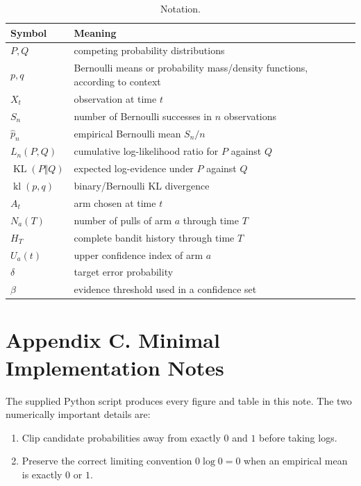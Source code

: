 \documentclass[en,nofont,11pt]{elegantbook}
\newcommand{\KL}{\operatorname{KL}}
\newcommand{\kl}{\operatorname{kl}}
\begin{document}
\begin{table}[H]
\centering
\caption*{Notation.}
\begin{tabular}{p{}p{}}
\toprule
Symbol & Meaning \\
\midrule
$P,Q$ & competing probability distributions \\
$p,q$ & Bernoulli means or probability mass/density functions, according to context \\
$X_t$ & observation at time $t$ \\
$S_n$ & number of Bernoulli successes in $n$ observations \\
$\widehat p_n$ & empirical Bernoulli mean $S_n/n$ \\
$L_n(P,Q)$ & cumulative log-likelihood ratio for $P$ against $Q$ \\
$\KL(P\Vert Q)$ & expected log-evidence under $P$ against $Q$ \\
$\kl(p,q)$ & binary/Bernoulli KL divergence \\
$A_t$ & arm chosen at time $t$ \\
$N_a(T)$ & number of pulls of arm $a$ through time $T$ \\
$H_T$ & complete bandit history through time $T$ \\
$U_a(t)$ & upper confidence index of arm $a$ \\
$\delta$ & target error probability \\
$\beta$ & evidence threshold used in a confidence set \\
\bottomrule
\end{tabular}
\end{table}

\chapter*{Appendix C. Minimal Implementation Notes}

The supplied Python script produces every figure and table in this note. The two numerically important details are:

\begin{enumerate}
\item Clip candidate probabilities away from exactly $0$ and $1$ before taking logs.
\item Preserve the correct limiting convention $0\log0=0$ when an empirical mean is exactly $0$ or $1$.
\end{enumerate}
\end{document}
